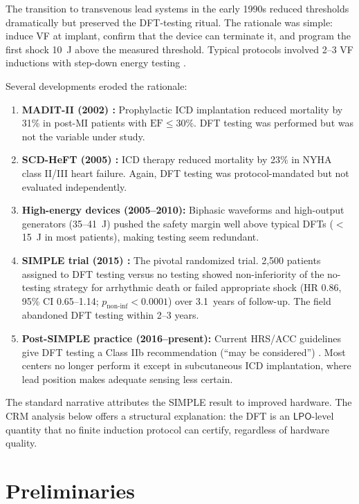 \documentclass[11pt,a4paper]{article}
\theoremstyle{plain}
\theoremstyle{definition}
\newcommand{\LPO}{\textsf{LPO}}
\begin{document}
The transition to transvenous lead systems in the early 1990s reduced thresholds dramatically but preserved the DFT-testing ritual.  The rationale was simple: induce VF at implant, confirm that the device can terminate it, and program the first shock 10~J above the measured threshold.  Typical protocols involved 2--3 VF inductions with step-down energy testing \cite{strickberger1994}.

Several developments eroded the rationale:

\begin{enumerate}[nosep]
\item \textbf{MADIT-II (2002) \cite{madit2}:} Prophylactic ICD implantation reduced mortality by 31\% in post-MI patients with $\mathrm{EF} \leq 30\%$.  DFT testing was performed but was not the variable under study.
\item \textbf{SCD-HeFT (2005) \cite{scdheft}:} ICD therapy reduced mortality by 23\% in NYHA class II/III heart failure.  Again, DFT testing was protocol-mandated but not evaluated independently.
\item \textbf{High-energy devices (2005--2010):}  Biphasic waveforms and high-output generators (35--41~J) pushed the safety margin well above typical DFTs ($<$15~J in most patients), making testing seem redundant.
\item \textbf{SIMPLE trial (2015) \cite{simple2013}:}  The pivotal randomized trial.  2,500 patients assigned to DFT testing versus no testing showed non-inferiority of the no-testing strategy for arrhythmic death or failed appropriate shock (HR 0.86, 95\% CI 0.65--1.14; $p_{\text{non-inf}} < 0.0001$) over 3.1~years of follow-up.  The field abandoned DFT testing within 2--3 years.
\item \textbf{Post-SIMPLE practice (2016--present):}  Current HRS/ACC guidelines give DFT testing a Class IIb recommendation (``may be considered'') \cite{hrs2017}.  Most centers no longer perform it except in subcutaneous ICD implantation, where lead position makes adequate sensing less certain.
\end{enumerate}

The standard narrative attributes the SIMPLE result to improved hardware.  The CRM analysis below offers a structural explanation: the DFT is an $\LPO$-level quantity that no finite induction protocol can certify, regardless of hardware quality.

\section{Preliminaries}\label{sec:prelim}
\end{document}
